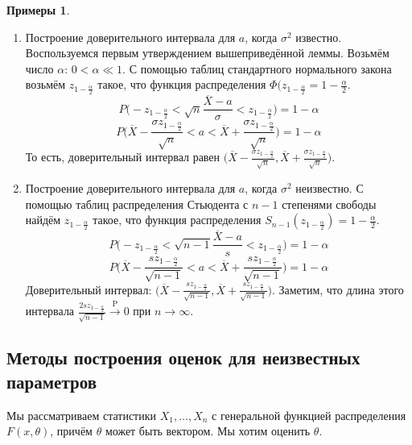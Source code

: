 \documentclass[11pt,openany,a4paper]{scrartcl}
\theoremstyle{plain}
\theoremstyle{definition}
\newtheorem{examples}[theorem]{Примеры}
\newcommand{\overto}[1]{\xrightarrow{#1}}
\newcommand{\ol}{\overline}
\begin{document}
\begin{examples}
\mbox{}
    \begin{enumerate}
        \item Построение доверительного интервала для $a$, когда $\sigma^2$ известно.
        Воспользуемся первым утверждением вышеприведённой леммы. Возьмём число
        $\alpha$: $0 < \alpha \ll 1$. С помощью таблиц стандартного нормального закона
        возьмём $z_{1 - \frac{\alpha}{2}}$ такое, что функция распределения
        $\Phi(z_{1 - \frac{\alpha}{2}} = 1 - \frac{\alpha}{2}$.
        $$
        P\bigg(-z_{1 - \frac{\alpha}{2}} < \sqrt{n}\frac{\ol X - a}{\sigma} <
        z_{1 - \frac{\alpha}{2}}\bigg) = 1 - \alpha
        $$
        $$
        P\bigg(\ol X - \frac{\sigma z_{1 - \frac{\alpha}{2}}}{\sqrt n} < a <
        \ol X + \frac{\sigma z_{1 - \frac{\alpha}{2}}}{\sqrt n}\bigg) = 1 - \alpha
        $$
        То есть, доверительный интервал равен
        $\Big(\ol X - \frac{\sigma z_{1 - \frac{\alpha}{2}}}{\sqrt n},
        \ol X + \frac{\sigma z_{1 - \frac{\alpha}{2}}}{\sqrt n}\Big)$.
        \item Построение доверительного интервала для $a$, когда $\sigma^2$ неизвестно.
        С помощью таблиц распределения Стьюдента с $n-1$ степенями свободы найдём
        $z_{1 - \frac{\alpha}{2}}$ такое, что функция распределения
        $S_{n-1}(z_{1 - \frac{\alpha}{2}}) = 1 - \frac{\alpha}{2}$.
        $$
        P\bigg(-z_{1 - \frac{\alpha}{2}} < \sqrt{n-1}\frac{\ol X - a}{s} <
        z_{1 - \frac{\alpha}{2}}\bigg) = 1 - \alpha
        $$
        $$
        P\bigg(\ol X - \frac{s z_{1 - \frac{\alpha}{2}}}{\sqrt{n-1}} < a <
        \ol X + \frac{s z_{1 - \frac{\alpha}{2}}}{\sqrt{n-1}}\bigg) = 1 - \alpha
        $$
        Доверительный интервал: $\Big(\ol X - \frac{s z_{1 - \frac{\alpha}{2}}}{\sqrt{n-1}},
        \ol X + \frac{s z_{1 - \frac{\alpha}{2}}}{\sqrt{n-1}}\Big)$. Заметим, что
        длина этого интервала $\frac{2sz_{1 - \frac{\alpha}{2}}}{\sqrt{n-1}}
        \overto{\mathrm P} 0$ при $n \to \infty$.
    \end{enumerate}
\end{examples}

\subsection{Методы построения оценок для неизвестных параметров}

Мы рассматриваем статистики $X_1, \ldots, X_n$ с генеральной функцией распределения $F(x, \theta)$,
причём $\theta$ может быть вектором. Мы хотим оценить $\theta$.
\end{document}
